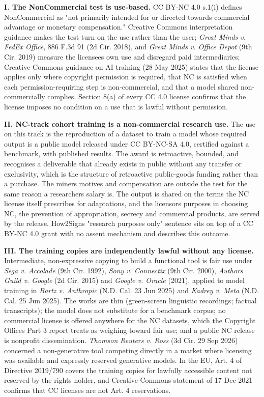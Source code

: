 \documentclass[10pt,a4paper]{article}
\begin{document}
\textbf{I. The NonCommercial test is use-based.} CC BY-NC 4.0 s.1(i)
defines NonCommercial as "not primarily intended for or directed towards
commercial advantage or monetary compensation." Creative
Commons\textquotesingle{} interpretation guidance makes the test turn on
the use rather than the user; \emph{Great Minds v. FedEx Office}, 886
F.3d 91 (2d Cir. 2018), and \emph{Great Minds v. Office Depot} (9th Cir.
2019) measure the licensee\textquotesingle s own use and disregard paid
intermediaries; Creative Commons\textquotesingle{} guidance on AI
training (28 May 2025) states that the license applies only where
copyright permission is required, that NC is satisfied when each
permission-requiring step is non-commercial, and that a model shared
non-commercially complies. Section 8(a) of every CC 4.0 license confirms
that the license imposes no condition on a use that is lawful without
permission.

\textbf{II. NC-track cohort training is a non-commercial research use.}
The use on this track is the reproduction of a dataset to train a model
whose required output is a public model released under CC BY-NC-SA 4.0,
certified against a benchmark, with published results. The award is
retroactive, bounded, and recognises a deliverable that already exists
in public without any transfer or exclusivity, which is the structure of
retroactive public-goods funding rather than a purchase. The
miners\textquotesingle{} motives and compensation are outside the test
for the same reason a researcher\textquotesingle s salary is. The output
is shared on the terms the NC license itself prescribes for adaptations,
and the licensor\textquotesingle s purposes in choosing NC, the
prevention of appropriation, secrecy and commercial products, are served
by the release. How2Sign\textquotesingle s "research purposes only"
sentence sits on top of a CC BY-NC 4.0 grant with no assent mechanism
and describes this outcome.

\textbf{III. The training copies are independently lawful without any
license.} Intermediate, non-expressive copying to build a functional
tool is fair use under \emph{Sega v. Accolade} (9th Cir. 1992),
\emph{Sony v. Connectix} (9th Cir. 2000), \emph{Authors Guild v. Google}
(2d Cir. 2015) and \emph{Google v. Oracle} (2021), applied to model
training in \emph{Bartz v. Anthropic} (N.D. Cal. 23 Jun 2025) and
\emph{Kadrey v. Meta} (N.D. Cal. 25 Jun 2025). The works are thin
(green-screen linguistic recordings; factual transcripts); the model
does not substitute for a benchmark corpus; no commercial license is
offered anywhere for the NC datasets, which the Copyright
Office\textquotesingle s Part 3 report treats as weighing toward fair
use; and a public NC release is nonprofit dissemination. \emph{Thomson
Reuters v. Ross} (3d Cir. 29 Sep 2026) concerned a non-generative tool
competing directly in a market where licensing was available and
expressly reserved generative models. In the EU, Art. 4 of Directive
2019/790 covers the training copies for lawfully accessible content not
reserved by the rights holder, and Creative Commons\textquotesingle{}
statement of 17 Dec 2021 confirms that CC licenses are not Art. 4
reservations.
\end{document}
